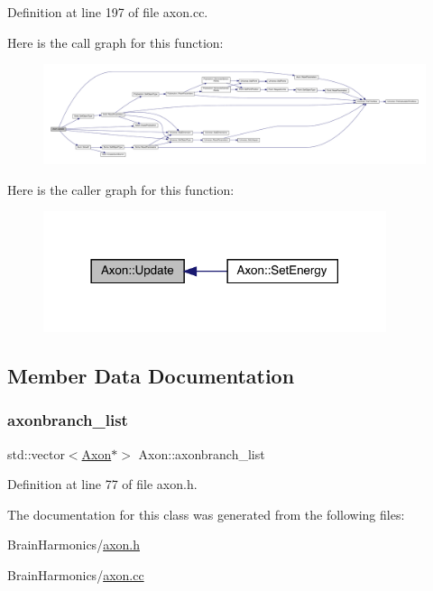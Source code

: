 Definition at line 197 of file axon.\+cc.

Here is the call graph for this function\+:
\nopagebreak
\begin{figure}[H]
\begin{center}
\leavevmode
\includegraphics[width=350pt]{class_axon_a472ee760a1727072afaff0035d1eedd9_cgraph}
\end{center}
\end{figure}
Here is the caller graph for this function\+:
\nopagebreak
\begin{figure}[H]
\begin{center}
\leavevmode
\includegraphics[width=285pt]{class_axon_a472ee760a1727072afaff0035d1eedd9_icgraph}
\end{center}
\end{figure}


\subsection{Member Data Documentation}
\mbox{\label{class_axon_ab32c0e4335cc4da8fe1aace7c16a88bf}} 
\subsubsection{\texorpdfstring{axonbranch\+\_\+list}{axonbranch\_list}}
{\footnotesize\ttfamily std\+::vector$<$\hyperlink{class_axon}{Axon}$\ast$$>$ Axon\+::axonbranch\+\_\+list\hspace{0.3cm}{\ttfamily [protected]}}



Definition at line 77 of file axon.\+h.



The documentation for this class was generated from the following files\+:\begin{DoxyCompactItemize}
\item 
Brain\+Harmonics/\hyperlink{axon_8h}{axon.\+h}\item 
Brain\+Harmonics/\hyperlink{axon_8cc}{axon.\+cc}\end{DoxyCompactItemize}

